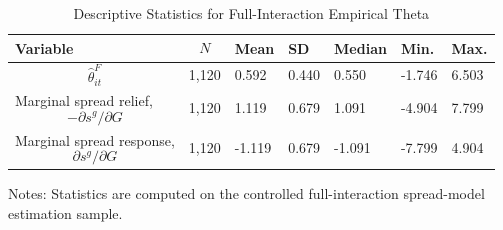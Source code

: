 \begin{table}[H]\centering
\begin{threeparttable}
\caption{Descriptive Statistics for Full-Interaction Empirical Theta}
\label{tab:theta_descriptive_stats}
\scriptsize
\begin{tabularx}{\textwidth}{lYYYYYY}
\toprule
Variable & $$N$$ & Mean & SD & Median & Min. & Max. \\
\midrule
$$\widehat{\theta}^{F}_{it}$$ & 1,120 & 0.592 & 0.440 & 0.550 & -1.746 & 6.503 \\
Marginal spread relief, $$-\partial s^g/\partial G$$ & 1,120 & 1.119 & 0.679 & 1.091 & -4.904 & 7.799 \\
Marginal spread response, $$\partial s^g/\partial G$$ & 1,120 & -1.119 & 0.679 & -1.091 & -7.799 & 4.904 \\
\bottomrule
\end{tabularx}
\begin{tablenotes}[flushleft]\footnotesize
\item Notes: Statistics are computed on the controlled full-interaction spread-model estimation sample.
\end{tablenotes}
\end{threeparttable}
\end{table}

